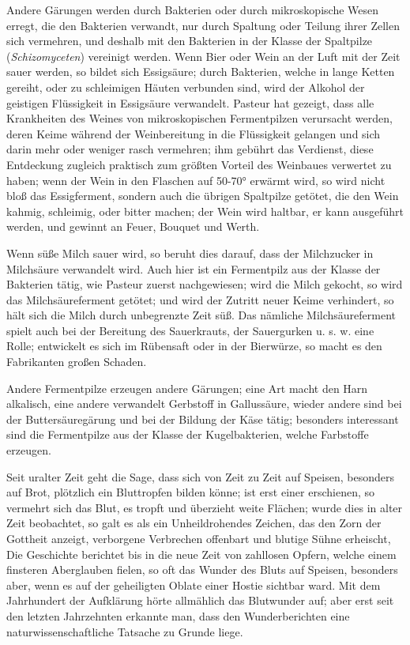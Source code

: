 \documentclass[a4paper, 11pt, oneside, english]{article}
\begin{document}
Andere Gärungen werden durch Bakterien oder durch mikroskopische Wesen erregt, die den Bakterien verwandt, nur durch Spaltung oder Teilung ihrer Zellen sich vermehren, und deshalb mit den Bakterien in der Klasse der Spaltpilze (\emph{Schizomyceten}) vereinigt werden. Wenn Bier oder Wein an der Luft mit der Zeit sauer werden, so bildet sich Essigsäure; durch Bakterien, welche in lange Ketten gereiht, oder zu schleimigen Häuten verbunden sind, wird der Alkohol der geistigen Flüssigkeit in Essigsäure verwandelt. Pasteur hat gezeigt, dass alle Krankheiten des Weines von mikroskopischen Fermentpilzen verursacht werden, deren Keime während der Weinbereitung in die Flüssigkeit gelangen und sich darin mehr oder weniger rasch vermehren; ihm gebührt das Verdienst, diese Entdeckung zugleich praktisch zum größten Vorteil des Weinbaues verwertet zu haben; wenn der Wein in den Flaschen auf 50-70° erwärmt wird, so wird nicht bloß das Essigferment, sondern auch die übrigen Spaltpilze getötet, die den Wein kahmig, schleimig, oder bitter machen; der Wein wird haltbar, er kann ausgeführt werden, und gewinnt an Feuer, Bouquet und Werth.

Wenn süße Milch sauer wird, so beruht dies darauf, dass der Milchzucker in Milchsäure verwandelt wird. Auch hier ist ein Fermentpilz aus der Klasse der Bakterien tätig, wie Pasteur zuerst nachgewiesen; wird die Milch gekocht, so wird das Milchsäureferment getötet; und wird der Zutritt neuer Keime verhindert, so hält sich die Milch durch unbegrenzte Zeit süß. Das nämliche Milchsäureferment spielt auch bei der Bereitung des Sauerkrauts, der Sauergurken u. s. w. eine Rolle; entwickelt es sich im Rübensaft oder in der Bierwürze, so macht es den Fabrikanten großen Schaden.

Andere Fermentpilze erzeugen andere Gärungen; eine Art macht den Harn alkalisch, eine andere verwandelt Gerbstoff in Gallussäure, wieder andere sind bei der Buttersäuregärung und bei der Bildung der Käse tätig; besonders interessant sind die Fermentpilze aus der Klasse der Kugelbakterien, welche Farbstoffe erzeugen.

Seit uralter Zeit geht die Sage, dass sich von Zeit zu Zeit auf Speisen, besonders auf Brot, plötzlich ein Bluttropfen bilden könne; ist erst einer erschienen, so vermehrt sich das Blut, es tropft und überzieht weite Flächen; wurde dies in alter Zeit beobachtet, so galt es als ein Unheildrohendes Zeichen, das den Zorn der Gottheit anzeigt, verborgene Verbrechen offenbart und blutige Sühne erheischt, Die Geschichte berichtet bis in die neue Zeit von zahllosen Opfern, welche einem finsteren Aberglauben fielen, so oft das Wunder des Bluts auf Speisen, besonders aber, wenn es auf der geheiligten Oblate einer Hostie sichtbar ward. Mit dem Jahrhundert der Aufklärung hörte allmählich das Blutwunder auf; aber erst seit den letzten Jahrzehnten erkannte man, dass den Wunderberichten eine naturwissenschaftliche Tatsache zu Grunde liege.
\end{document}
